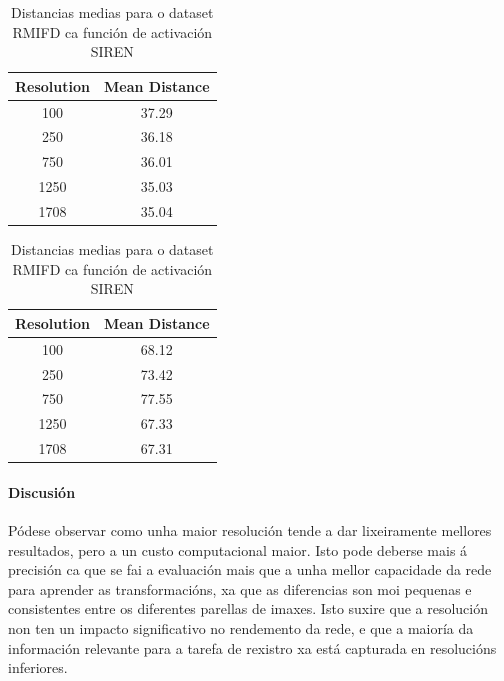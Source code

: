 \begin{table}[h]
    \centering
    \begin{minipage}[t]{0.45\linewidth}
        \centering
        \begin{tabular}{|c|c|}
        \hline
        Resolution & Mean Distance \\ \hline
        100 & 37.29 \\ \hline
        250 & 36.18 \\ \hline
        750 & 36.01 \\ \hline
        1250 & 35.03 \\ \hline
        1708 & 35.04 \\ \hline
        \end{tabular}
        \caption{Distancias medias para o dataset RFMID ca función de activación Relu}
        \label{tab:mlp_mean_distances_rfmid}
    \end{minipage}
    \hfill
    \begin{minipage}[t]{0.45\linewidth}
        \centering
        \begin{tabular}{|c|c|}
        \hline
        Resolution & Mean Distance \\ \hline
        100 & 68.12 \\ \hline
        250 & 73.42 \\ \hline
        750 & 77.55 \\ \hline
        1250 & 67.33 \\ \hline
        1708 & 67.31 \\ \hline
        \end{tabular}
        \caption{Distancias medias para o dataset RMIFD ca función de activación SIREN}
        \label{tab:siren_mean_distances_rfmid}
    \end{minipage}
\end{table}

\paragraph{Discusión}
\label{par:Discusion-resolution}

Pódese observar como unha maior resolución tende a dar lixeiramente mellores resultados, pero a un custo computacional maior.
Isto pode deberse mais á precisión ca que se fai a evaluación mais que a unha mellor capacidade da rede para aprender as transformacións, xa que as diferencias son moi pequenas e consistentes entre os diferentes parellas de imaxes.
Isto suxire que a resolución non ten un impacto significativo no rendemento da rede, e que a maioría da información relevante para a tarefa de rexistro xa está capturada en resolucións inferiores.


